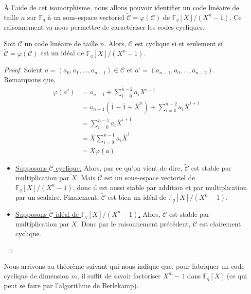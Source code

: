 	À l'aide de cet isomorphisme, nous allons pouvoir identifier un code linéaire de taille $n$ sur $\mathbb{F}_q$ à un sous-espace vectoriel $\widetilde{\mathcal{C}} = \varphi(\mathcal{C})$ de $\mathbb{F}_q[X]/(X^n-1)$. Ce raisonnement va nous permettre de caractériser les codes cycliques.
	
	\begin{proposition}
		\label{codes-correcteurs-2}
		Soit $\mathcal{C}$ un code linéaire de taille $n$. Alors, $\mathcal{C}$ est cyclique si et seulement si $\widetilde{\mathcal{C}} = \varphi(\mathcal{C})$ est un idéal de $\mathbb{F}_q[X]/(X^n-1)$.
	\end{proposition}
	
	\begin{proof}
		Soient $a = (a_0, a_1, \dots, a_{n-1}) \in \mathcal{C}$ et $a' = (a_{n-1}, a_0, \dots, a_{n-2})$. Remarquons que,
		\begin{align*}
			\varphi(a') &= \overline{a_{n-1} + \sum_{i=0}^{n-2} a_i X^{i+1}} \\
			&= a_{n-1} (\overline{1} - \overline{1} + \overline{X}^n) + \sum_{i=0}^{n-2} a_i \overline{X}^{i+1} \\
			&= \sum_{i=0}^{n-1} a_i \overline{X}^{i+1} \\
			&= \overline{X}\sum_{i=0}^{n-1} a_i \overline{X}^{i} \\
			&= \overline{X}\varphi(a)
		\end{align*}
		\begin{itemize}
			\item \underline{Supposons $\mathcal{C}$ cyclique.} Alors, par ce qu'on vient de dire, $\widetilde{\mathcal{C}}$ est stable par multiplication par $X$. Mais $\widetilde{\mathcal{C}}$ est un sous-espace vectoriel de $\mathbb{F}_q[X]/(X^n-1)$, donc il est aussi stable par addition et par multiplication par un scalaire. Finalement, $\widetilde{\mathcal{C}}$ est bien un idéal de $\mathbb{F}_q[X]/(X^n-1)$.
			\item \underline{Supposons $\widetilde{\mathcal{C}}$ idéal de $\mathbb{F}_q[X]/(X^n-1)$.} Alors, $\widetilde{\mathcal{C}}$ est stable par multiplication par $X$. Donc par le raisonnement précédent, $\mathcal{C}$ est clairement cyclique.
		\end{itemize}
	\end{proof}
	
	Nous arrivons au théorème suivant qui nous indique que, pour fabriquer un code cyclique de dimension $m$, il suffit de savoir factoriser $X^m - 1$ dans $\mathbb{F}_q[X]$ (ce qui peut se faire par l'algorithme de Berlekamp).
	
